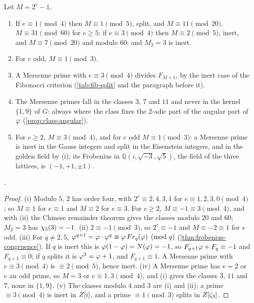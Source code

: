 \begin{proposition}\label{prop:mersenne-exponent}
Let $M=2^e-1$.
\begin{enumerate}[label=\textup{(\roman*)}]
  \item If $e\equiv1\pmod4$ then $M\equiv1\pmod5$, split, and $M\equiv11\pmod{20}$, $M\equiv31\pmod{60}$
    for $e\geq5$; if $e\equiv3\pmod4$ then $M\equiv2\pmod5$, inert, and $M\equiv7\pmod{20}$ and modulo
    $60$; and $M_2=3$ is inert.
  \item For $e$ odd, $M\equiv1\pmod3$.
  \item A Mersenne prime with $e\equiv3\pmod4$ divides $F_{M+1}$, by the inert case of the Fibonacci
    criterion (\cref{tab:fib-split} and the paragraph before it).
  \item The Mersenne primes fall in the classes $3$, $7$ and $11$ and never in the kernel $\{1,9\}$
    of $G$: always where the class fixes the $2$-adic part of the angular part of $\varphi$ (\cref{prop:class-angular}).
  \item For $e\geq2$, $M\equiv3\pmod4$, and for $e$ odd $M\equiv1\pmod3$: a Mersenne prime is inert in the
    Gauss integers and split in the Eisenstein integers, and in the golden field by (i); its
    Frobenius in $\mathbb{Q}(i,\sqrt{-3},\sqrt5)$, the field of the three lattices, is $(-1,+1,\pm1)$.
\end{enumerate}
\end{proposition}
\cite{gonzalez26mersenne}.
\begin{proof}
(i) Modulo $5$, $2$ has order four, with $2^e\equiv2,4,3,1$ for $e\equiv1,2,3,0\pmod4$; so $M\equiv1$ for $e\equiv1$
and $M\equiv2$ for $e\equiv3$.  For $e\geq2$, $M\equiv-1\equiv3\pmod4$, and with (ii) the Chinese remainder theorem
gives the classes modulo $20$ and $60$; $M_2=3$ has $\chi_5(3)=-1$.
(ii) $2\equiv-1\pmod3$, so $2^e\equiv-1$ and $M\equiv-2\equiv1$ for $e$ odd.
(iii) For $q\neq2,5$, $\varphi^{q+1}=\varphi\cdot\varphi^q\equiv\varphi\,Fr_q(\varphi)\pmod q$
(\cref{thm:frobenius-congruence}).  If $q$ is inert this is $\varphi(1-\varphi)=N(\varphi)=-1$, so
$F_{q+1}\varphi+F_q\equiv-1$ and $F_{q+1}\equiv0$; if $q$ splits it is $\varphi^2=\varphi+1$, and $F_{q+1}\equiv1$.  A
Mersenne prime with $e\equiv3\pmod4$ is $\equiv2\pmod5$, hence inert.
(iv) A Mersenne prime has $e=2$ or $e$ an odd prime, so $M=3$ or $e\equiv1,3\pmod4$, and (i) gives the classes $3$,
$11$ and $7$, none in $\{1,9\}$.
(v) The classes modulo $4$ and $3$ are (i) and (ii); a prime $\equiv3\pmod4$ is inert in $Z[i]$, and a prime
$\equiv1\pmod3$ splits in $Z[\zeta_3]$.
\end{proof}

